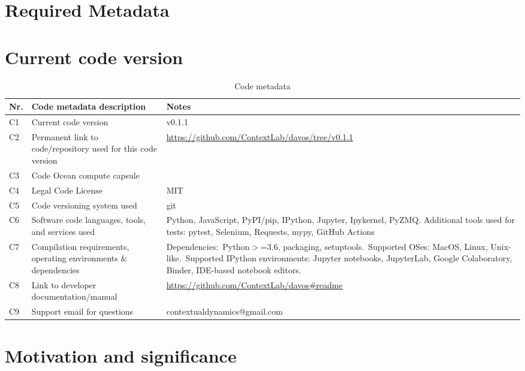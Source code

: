 \documentclass[preprint,12pt, a4paper]{elsarticle}
\begin{document}
\section*{Required Metadata}

\section*{Current code version}


\begin{table}[H]
\begin{tabular}{|l|p{6.5cm}|p{6.5cm}|}
\hline
\textbf{Nr.} & \textbf{Code metadata description} & \textbf{Notes} \\
\hline
C1 & Current code version &  v0.1.1 \\
\hline
C2 & Permanent link to code/repository used for this code version & \url{https://github.com/ContextLab/davos/tree/v0.1.1} \\
\hline
C3 & Code Ocean compute capsule & \\
\hline
C4 & Legal Code License & MIT \\
\hline
C5 & Code versioning system used & git \\
\hline
C6 & Software code languages, tools, and services used & Python, JavaScript, PyPI/pip, IPython, Jupyter, Ipykernel, PyZMQ. Additional tools used for tests: pytest, Selenium, Requests, mypy, GitHub Actions \\
\hline
C7 & Compilation requirements, operating environments \& dependencies & Dependencies:~Python$>$=3.6, packaging, setuptools.~Supported OSes: MacOS, Linux, Unix-like.~Supported IPython environments: Jupyter notebooks, JupyterLab, Google Colaboratory, Binder, IDE-based notebook editors. \\
\hline
C8 & Link to developer documentation/manual & \url{https://github.com/ContextLab/davos\#readme} \\
\hline
C9 & Support email for questions & contextualdynamics@gmail.com \\
\hline
\end{tabular}
\caption{Code metadata}
\label{}
\end{table}

\linenumbers


\section{Motivation and significance}
\end{document}
